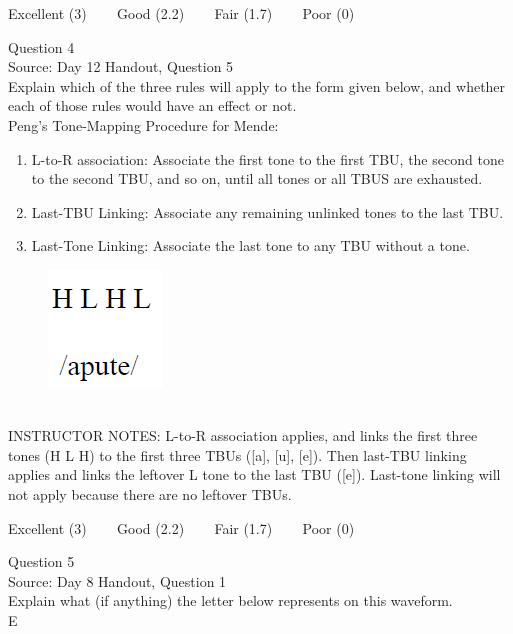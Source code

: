 \documentclass[12pt]{article}
\begin{document}
\vfill
Excellent (3) ~~~ Good (2.2) ~~~ Fair (1.7) ~~~ Poor (0)
\newpage

{\large Question 4}\\

Source: Day 12 Handout, Question 5\\

Explain which of the three rules will apply to the form given below, and whether each of those rules would have an effect or not.\\

Peng’s Tone-Mapping Procedure for Mende: \begin{enumerate} \item L-to-R association: Associate the first tone to the first TBU, the second tone to the second TBU, and so on, until all tones or all TBUS are exhausted. \item Last-TBU Linking: Associate any remaining unlinked tones to the last TBU. \item Last-Tone Linking: Associate the last tone to any TBU without a tone. \end{enumerate}

\begin{figure}[H]
\includegraphics{../images/mendetone_d.png}
\end{figure}

~\\
INSTRUCTOR NOTES: L-to-R association applies, and links the first three tones (H L H) to the first three TBUs ([a], [u], [e]). Then last-TBU linking applies and links the leftover L tone to the last TBU ([e]). Last-tone linking will not apply because there are no leftover TBUs.


\vfill
Excellent (3) ~~~ Good (2.2) ~~~ Fair (1.7) ~~~ Poor (0)
\newpage

{\large Question 5}\\

Source: Day 8 Handout, Question 1\\

Explain what (if anything) the letter below represents on this waveform.\\

E
\end{document}
